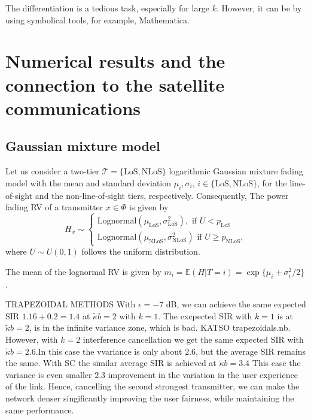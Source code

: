 \documentclass[lettersize,journal]{IEEEtran}
\begin{document}
The differentiation is a tedious task, especially for large $k$. However, it can be by using symbolical tools, for example, Mathematica.









\section{Numerical results and the connection to the satellite communications}

\subsection{Gaussian mixture model}
Let us consider a two-tier $\mathcal{T} = \{\text{LoS},\text{NLoS}\}$ logarithmic Gaussian mixture fading model with the mean and standard deviation $\mu_{i},\sigma_{i}$, $i \in \{\text{LoS},\text{NLoS} \}$, for the line-of-sight and the non-line-of-sight tiers, respectively. Consequently, The power fading RV of a transmitter $x \in \Phi$ is given by
\begin{equation}
  H_x \sim
  \begin{cases}
    \text{Lognormal}(\mu_{\text{LoS}},\sigma_{\text{LoS}}^2), \text{ if } U<p_{\text{LoS}} \\
    \text{Lognormal}(\mu_{\text{NLoS}},\sigma_{\text{NLoS}}^2)\text{ if } U \geq p_{\text{NLoS}},              \label{eq:tier2lognormal}
  \end{cases}
\end{equation}
where $U \sim U(0,1)$ follows the uniform distribution.





The mean of the lognormal RV is given by $ m_i=\mathbb{E}(H|T=i) = \exp \{\mu_i+\sigma_i^2/2\}$.

TRAPEZOIDAL METHODS
With $\epsilon = -7$ dB, we can achieve the same expected SIR $1.16+0.2=1.4$ at $\tilde{\kappa} b= 2$ with $k=1$.  The excpected SIR with $k=1$ is at $\tilde{\kappa} b = 2$, is in the infinite variance zone, which is bad. KATSO trapezoidals.nb. However, with $k=2$ interference cancellation we get the same expected SIR with $\tilde{\kappa}b =2.6$.In this case the vvariance is  only about $2.6$, but the average SIR remains the same. With SC the similar average SIR is achieved at $\tilde{\kappa}b = 3.4$ This case the variance is even smaller $2.3$ improvement in the variation in the user experience of the link.  Hence, cancelling the second strongest transmitter, we can make the network denser singificantly improving the user fairness, while maintaining the same performance.
\end{document}
